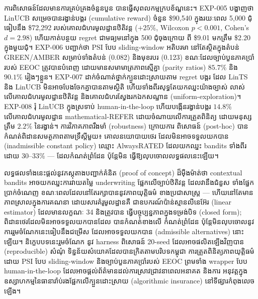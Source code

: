 ការពិសោធន៍ដែលមានការគ្រប់គ្រងចំនួនបួន បានធ្វើសុពលកម្មក្របខ័ណ្ឌនេះ។ EXP-005 បង្ហាញថា LinUCB សម្រេចបានរង្វាន់បង្គរ (cumulative reward) ចំនួន \$90{,}540 ក្នុងរយៈពេល 5{,}000 ជុំ ធៀបនឹង \$72{,}292 របស់គោលជំហរមូលដ្ឋានឋិតិវន្ត ($+25\%$, Wilcoxon $p < 0.001$, Cohen's $d = 2.98$) ហើយកាត់បន្ថយ regret ជាមធ្យមនៅក្នុង 500 ជុំចុងក្រោយ ពី \$9.01 មកត្រឹម \$2.20 ក្នុងមួយជុំ។ EXP-006 បញ្ជាក់ថា PSI បែប sliding-window អតិបរមា នៅតែស្ថិតក្នុងតំបន់ GREEN/AMBER សម្រាប់ទាំងតំបន់ (0.082) និងមុខរបរ (0.123) ខណៈដែលច្បាប់បួនភាគប្រាំរបស់ EEOC ត្រូវបានបំពេញ ដោយមានសមាមាត្រភាពស្មើគ្នា (parity ratios) $85.7\%$ និង $90.1\%$ រៀងៗខ្លួន។ EXP-007 ដាក់ចំណាត់ថ្នាក់ក្បួនដោះស្រាយតាម regret បង្គរ ដែល LinTS និង LinUCB មិនអាចបែងចែកគ្នាបានតាមស្ថិតិ ហើយទាំងពីរសុទ្ធតែយកឈ្នះយ៉ាងច្បាស់ លាស់លើគោលជំហរមូលដ្ឋានឋិតិវន្ត និងគោលជំហរស្វែងរកឯកសណ្ឋាន (uniform-exploration)។ EXP-008 រុំ LinUCB ក្នុងស្រទាប់ human-in-the-loop ហើយបង្កើនរង្វាន់បង្គរ $14.8\%$ លើគោលជំហរមូលដ្ឋាន mathematical-REFER ដោយចំណាយលើការត្រួតពិនិត្យ ដោយមនុស្សត្រឹម $2.2\%$ នៃរង្វាន់។ ការវិភាគភាពរឹងមាំ (robustness) ក្រោយការ ពិសោធន៍ (post-hoc) បានកំណត់ពិដានសមត្ថភាពតាមទ្រឹស្តីមួយ៖ គោលនយោបាយថេរ ដែលមិនអាចទទួលយកបាន (inadmissible constant policy) ឈ្មោះ AlwaysRATED ដែលយកឈ្នះ bandits ទាំងពីរដោយ 30--33\% --- ដែលកំណត់ព្រំដែន ប៉ុន្តែមិន ធ្វើឱ្យលុបចោលលទ្ធផលនេះឡើយ។

លទ្ធផលទាំងនេះផ្តល់នូវភស្តុតាងបញ្ជាក់គំនិត (proof of concept) ដ៏ម៉ឺងម៉ាត់ថា contextual bandits អាចយកឈ្នះការវាយតម្លៃ underwriting ផ្អែកលើច្បាប់ឋិតិវន្ត ដែលវានឹងជំនួស ទាំងផ្នែកប្រាក់ចំណេញ ខណៈពេលដែលនៅតែរក្សាបាននូវភាពយុត្តិធម៌ ខាងប្រជាសាស្ត្រ --- ហើយនៅតែមានភាពស្រាលក្នុងការគណនា ដោយសារគំរូមូលដ្ឋានគឺ ជាឧបករណ៍ប៉ាន់ស្មានលីនេអ៊ែរ (linear estimator) ដែលមានលក្ខណៈ 34 និងត្រូវបាន ធ្វើបច្ចុប្បន្នភាពក្នុងទម្រង់បិទ (closed form); ពិដានថេរដែលមិនអាចទទួលយកបានដែល បានកំណត់ខាងលើ កំណត់ព្រំដែន ប៉ុន្តែមិនលុបចោលនូវការរួមចំណែកនេះធៀបនឹងជម្រើស ដែលអាចទទួលយកបាន (admissible alternatives) នោះឡើយ។ និក្ខេបបទនេះរួមចំណែក នូវ harness ពិសោធន៍ 20-seed ដែលអាចផលិតឡើងវិញបាន (reproducible) សំណុំ ទិន្នន័យសំយោគដែលបានក្រិតតាមបរិបទកម្ពុជា ការត្រួតពិនិត្យភាពយុត្តិធម៌ដោយ PSI បែប sliding-window និងច្បាប់បួនភាគប្រាំរបស់ EEOC ព្រមទាំង wrapper បែប human-in-the-loop ដែលអាចផ្តល់ព័ត៌មានដល់ការស្រាវជ្រាវនាពេលអនាគត និងការ អនុវត្តក្នុងឧស្សាហកម្មនៃធានារ៉ាប់រងផ្អែកលើក្បួនដោះស្រាយ (algorithmic insurance) នៅទីផ្សារកំពុងលេចឡើង។
\endgroup

